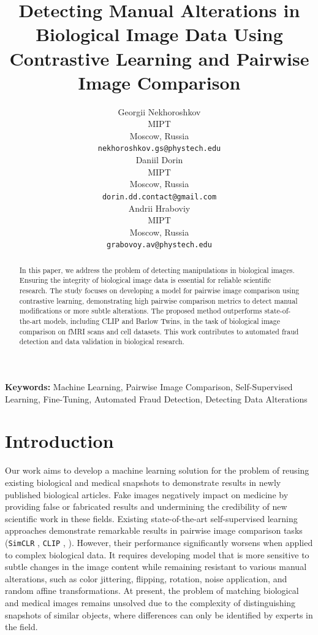 \documentclass{article}
\title{Detecting Manual Alterations in Biological Image Data 
Using Contrastive Learning and Pairwise Image Comparison}
\author{%
  Georgii Nekhoroshkov\\
  MIPT\\
  Moscow, Russia\\
  \texttt{nekhoroshkov.gs@phystech.edu}\\
  \And
  Daniil Dorin\\
  MIPT\\
  Moscow, Russia\\
  \texttt{dorin.dd.contact@gmail.com}\\
  \And
  Andrii Hraboviy\\
  MIPT\\
  Moscow, Russia\\
  \texttt{grabovoy.av@phystech.edu}\\
}
\begin{document}
\maketitle

\begin{abstract}

    In this paper, we address the problem of detecting manipulations in biological images. 
    Ensuring the integrity of biological 
    image data is essential for reliable scientific research. 
    The study focuses on developing a model for pairwise image comparison
    using contrastive learning, demonstrating high pairwise comparison metrics to detect 
    manual modifications or more subtle alterations. 
    The proposed method outperforms state-of-the-art models, 
    including CLIP and Barlow Twins, in the task of biological 
    image comparison on fMRI scans and cell datasets. 
    This work contributes to automated fraud detection and data validation in 
    biological research.

\end{abstract}

\textbf{Keywords:}
Machine Learning, Pairwise Image Comparison, Self-Supervised Learning, 
Fine-Tuning, Automated Fraud Detection, Detecting Data Alterations

\section{Introduction}\label{sec:intro}

Our work aims to develop a machine learning solution for the problem 
of reusing existing biological and medical snapshots to demonstrate results 
in newly published biological articles. Fake images negatively impact on 
medicine by providing false or fabricated results and undermining the credibility 
of new scientific work in these fields. Existing state-of-the-art self-supervised learning 
approaches demonstrate remarkable results in pairwise image comparison tasks 
(\texttt{SimCLR} \cite{chen2020simclr}, \texttt{CLIP} \cite{radford2021clip}, 
 \cite{zbontar2021barlow}). 
However, their performance significantly worsens when applied to complex biological data. 
It requires developing model that is more sensitive to subtle changes in the image content 
while remaining resistant to various manual alterations, such as color jittering, 
flipping, rotation, noise application, and random affine transformations. 
At present, the problem of matching biological and medical images remains unsolved due 
to the complexity of distinguishing snapshots of similar objects, where 
differences can only be identified by experts in the field.
\end{document}
